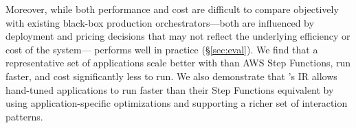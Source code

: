 Moreover, while both performance and cost are difficult to compare objectively
with existing black-box production orchestrators---both are influenced by
deployment and pricing decisions that may not reflect the underlying efficiency
or cost of the system---\name{} performs well in practice (\S\ref{sec:eval}). We
find that a representative set of applications scale better with \name{} than
AWS Step Functions, run faster, and cost significantly less to run. We also
demonstrate that \name{}'s IR allows hand-tuned applications to run faster than
their Step Functions equivalent by using application-specific optimizations and
supporting a richer set of interaction patterns.
